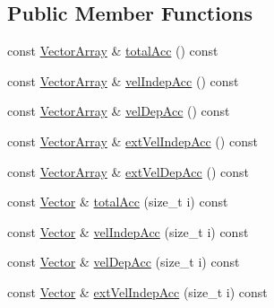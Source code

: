 \subsection*{Public Member Functions}
\begin{DoxyCompactItemize}
\item 
const \mbox{\hyperlink{class_space_h_1_1_interactions_ac9d9b24b469c4be73b96ce0f09f93fcf}{Vector\+Array}} \& \mbox{\hyperlink{class_space_h_1_1_interactions_a77d514a1346180fd39679352cd4de5ed}{total\+Acc}} () const
\item 
const \mbox{\hyperlink{class_space_h_1_1_interactions_ac9d9b24b469c4be73b96ce0f09f93fcf}{Vector\+Array}} \& \mbox{\hyperlink{class_space_h_1_1_interactions_af9568e6cb38cfa30480c2d267f5cc442}{vel\+Indep\+Acc}} () const
\item 
const \mbox{\hyperlink{class_space_h_1_1_interactions_ac9d9b24b469c4be73b96ce0f09f93fcf}{Vector\+Array}} \& \mbox{\hyperlink{class_space_h_1_1_interactions_ade044b9e2a362b35aee04462d70d49ae}{vel\+Dep\+Acc}} () const
\item 
const \mbox{\hyperlink{class_space_h_1_1_interactions_ac9d9b24b469c4be73b96ce0f09f93fcf}{Vector\+Array}} \& \mbox{\hyperlink{class_space_h_1_1_interactions_a26c95f1540b9b0646d5d975ca1d3ca01}{ext\+Vel\+Indep\+Acc}} () const
\item 
const \mbox{\hyperlink{class_space_h_1_1_interactions_ac9d9b24b469c4be73b96ce0f09f93fcf}{Vector\+Array}} \& \mbox{\hyperlink{class_space_h_1_1_interactions_a0513d1e434ad7c7eefeb57d1cd8f45f8}{ext\+Vel\+Dep\+Acc}} () const
\item 
const \mbox{\hyperlink{class_space_h_1_1_interactions_aaebe228fb44635e85cdb8cc9c10d30d1}{Vector}} \& \mbox{\hyperlink{class_space_h_1_1_interactions_ae59b86cfff2e966076f90f1ebed099dd}{total\+Acc}} (size\+\_\+t i) const
\item 
const \mbox{\hyperlink{class_space_h_1_1_interactions_aaebe228fb44635e85cdb8cc9c10d30d1}{Vector}} \& \mbox{\hyperlink{class_space_h_1_1_interactions_a5293a4d03004f7f454e3e1c7e7d04310}{vel\+Indep\+Acc}} (size\+\_\+t i) const
\item 
const \mbox{\hyperlink{class_space_h_1_1_interactions_aaebe228fb44635e85cdb8cc9c10d30d1}{Vector}} \& \mbox{\hyperlink{class_space_h_1_1_interactions_a7d05ece2dd2961b7f577ff019fad97da}{vel\+Dep\+Acc}} (size\+\_\+t i) const
\item 
const \mbox{\hyperlink{class_space_h_1_1_interactions_aaebe228fb44635e85cdb8cc9c10d30d1}{Vector}} \& \mbox{\hyperlink{class_space_h_1_1_interactions_ad2b05f1d0f50c5136aa5e437fd8e6226}{ext\+Vel\+Indep\+Acc}} (size\+\_\+t i) const

\end{DoxyCompactItemize}

